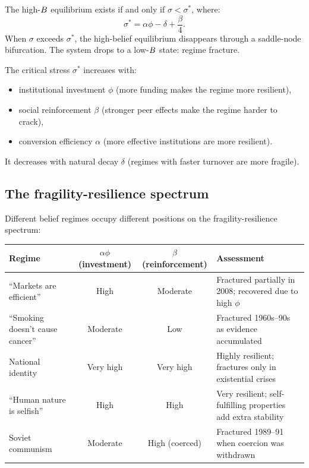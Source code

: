 \begin{proposition}
\label{prop:critical-stress}
The high-$B_{}$ equilibrium exists if and only if $\sigma < \sigma^*$, where:
\[
  \sigma^* = \alpha\phi - \delta + \frac{\beta}{4}.
\]
When $\sigma$ exceeds $\sigma^*$, the high-belief equilibrium disappears through a saddle-node bifurcation.
The system drops to a low-$B_{}$ state: regime fracture.

The critical stress $\sigma^*$ increases with:
\begin{itemize}[nosep]
  \item institutional investment $\phi$ (more funding makes the regime more resilient),
  \item social reinforcement $\beta$ (stronger peer effects make the regime harder to crack),
  \item conversion efficiency $\alpha$ (more effective institutions are more resilient).
\end{itemize}
It decreases with natural decay $\delta$ (regimes with faster turnover are more fragile).
\end{proposition}

\subsection{The fragility-resilience spectrum}

\begin{example}
\label{ex:fragility-spectrum}
Different belief regimes occupy different positions on the fragility-resilience spectrum:

\begin{center}
\begin{tabular}{p{3.5cm}ccp{4cm}}
\toprule
Regime & $\alpha\phi$ (investment) & $\beta$ (reinforcement) & Assessment \\
\midrule
``Markets are efficient'' & High & Moderate & Fractured partially in 2008; recovered due to high $\phi$ \\[4pt]
``Smoking doesn't cause cancer'' & Moderate & Low & Fractured 1960s--90s as evidence accumulated \\[4pt]
National identity & Very high & Very high & Highly resilient; fractures only in existential crises \\[4pt]
``Human nature is selfish'' & High & High & Very resilient; self-fulfilling properties add extra stability \\[4pt]
Soviet communism & Moderate & High (coerced) & Fractured 1989--91 when coercion was withdrawn \\
\bottomrule
\end{tabular}
\end{center}
\end{example}

